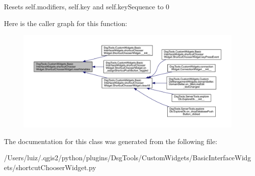 \begin{DoxyVerb}Resets self.modifiers, self.key and self.keySequence to 0
\end{DoxyVerb}
 Here is the caller graph for this function\+:
\nopagebreak
\begin{figure}[H]
\begin{center}
\leavevmode
\includegraphics[width=350pt]{class_dsg_tools_1_1_custom_widgets_1_1_basic_interface_widgets_1_1shortcut_chooser_widget_1_1_shortcut_chooser_widget_a50a6bd0dc5816cdceb0ce0498cc466fe_icgraph}
\end{center}
\end{figure}


The documentation for this class was generated from the following file\+:\begin{DoxyCompactItemize}
\item 
/\+Users/luiz/.\+qgis2/python/plugins/\+Dsg\+Tools/\+Custom\+Widgets/\+Basic\+Interface\+Widgets/shortcut\+Chooser\+Widget.\+py\end{DoxyCompactItemize}
